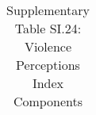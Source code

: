 \begin{longtable}{llcccccccccc}
\caption{Supplementary Table SI.24: Violence Perceptions Index Components} \label{tab:pap__c1_2} \\                                                                                                                                                                                                                                                                                                                                                                                                                                                                                                                                                                                                                                                                                                                                                                                       
\hline \hline                                                                                                                                                                                                                                                                                                                                                                                                                                                                                                                                                                                                                                                                                                                                                                                                                                                                             

\end{longtable}
